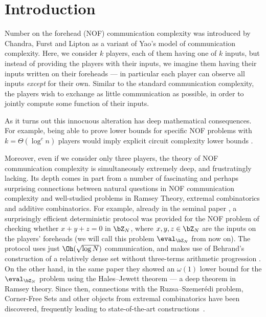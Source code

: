 \section{Introduction}


Number on the forehead (NOF) communication complexity was introduced by Chandra, Furst and Lipton \cite{CFL83} as a variant of Yao's model of communication complexity. Here, we consider $k$ players, each of them having one of $k$ inputs, but instead of providing the players with their inputs, we imagine them having their inputs written on their foreheads --- in particular each player can observe all inputs \emph{except} for their own. Similar to the standard communication complexity, the players wish to exchange as little communication as possible, in order to jointly compute some function of their inputs.

As it turns out this innocuous alteration has deep mathematical consequences. For example, being able to prove lower bounds for specific NOF problems with $k = \Theta(\log^c n)$ players would imply explicit circuit complexity lower bounds \cite{HG90,BT94}.

Moreover, even if we consider only three players, the theory of NOF communication complexity is simultaneously extremely deep, and frustratingly lacking. Its depth comes in part from a number of fascinating and perhaps surprising connections between natural questions in NOF communication complexity and well-studied problems in Ramsey Theory, extremal combinatorics and additive combinatorics. For example, already in the seminal paper \cite{CFL83}, a surprisingly efficient deterministic protocol  was provided for the NOF problem of checking whether $x+y+z = 0$ in $\bZ_N$, where $x,y,z \in \bZ_N$ are the inputs on the players' foreheads (we will call this problem $\eval_{\bZ_N}$ from now on). The protocol uses just $\Oh(\sqrt{\log N})$ communication, and makes use of Behrand's construction of a relatively dense set without three-terms arithmetic progression \cite{behrend}. On the other hand, in the same paper they showed an $\omega(1)$ lower bound for the $\eval_{\bZ_N}$ problem using the Hales–Jewett theorem --- a deep theorem in Ramsey theory. Since then, connections with the Ruzsa–Szemerédi problem, Corner-Free Sets and other objects from extremal combinatorics have been discovered, frequently leading to state-of-the-art constructions~\cite{LPS17, AS20,AMS12,LS21, CFTZ21}.

